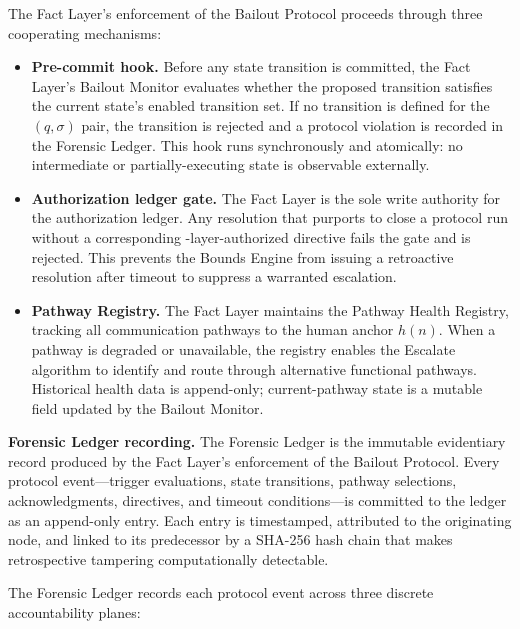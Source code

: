 The Fact Layer's enforcement of the Bailout Protocol proceeds through three cooperating mechanisms:

\begin{itemize}\itemsep=0pt
\item[(\textit{i})] \textbf{Pre-commit hook.} Before any state transition is committed, the Fact Layer's Bailout Monitor evaluates whether the proposed transition satisfies the current state's enabled transition set. If no transition is defined for the $(q, \sigma)$ pair, the transition is rejected and a protocol violation is recorded in the Forensic Ledger. This hook runs synchronously and atomically: no intermediate or partially-executing state is observable externally.

\item[(\textit{ii})] \textbf{Authorization ledger gate.} The Fact Layer is the sole write authority for the authorization ledger. Any resolution that purports to close a protocol run without a corresponding \purpose-layer-authorized directive fails the gate and is rejected. This prevents the Bounds Engine from issuing a retroactive resolution after timeout to suppress a warranted escalation.

\item[(\textit{iii})] \textbf{Pathway Registry.} The Fact Layer maintains the Pathway Health Registry, tracking all communication pathways to the human anchor $h(n)$. When a pathway is degraded or unavailable, the registry enables the Escalate algorithm to identify and route through alternative functional pathways. Historical health data is append-only; current-pathway state is a mutable field updated by the Bailout Monitor.
\end{itemize}

\bigskip
\noindent\textbf{Forensic Ledger recording.} The Forensic Ledger is the immutable evidentiary record produced by the Fact Layer's enforcement of the Bailout Protocol. Every protocol event---trigger evaluations, state transitions, pathway selections, acknowledgments, directives, and timeout conditions---is committed to the ledger as an append-only entry. Each entry is timestamped, attributed to the originating node, and linked to its predecessor by a SHA-256 hash chain that makes retrospective tampering computationally detectable.

The Forensic Ledger records each protocol event across three discrete accountability planes:

